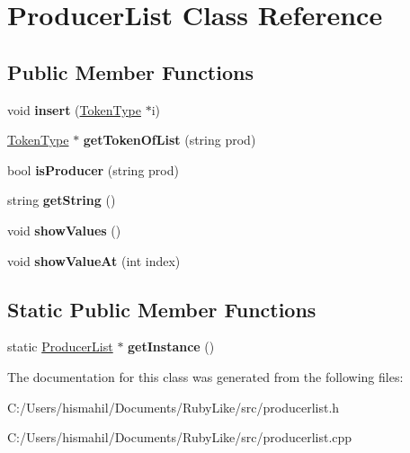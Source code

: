 \hypertarget{class_producer_list}{\section{Producer\-List Class Reference}
\label{class_producer_list}
}
\subsection*{Public Member Functions}
\begin{DoxyCompactItemize}
\item 
\hypertarget{class_producer_list_a3e17fb470a8d0079bcceb7c82e1ad45a}{void {\bfseries insert} (\hyperlink{class_token_type}{Token\-Type} $\ast$i)}\label{class_producer_list_a3e17fb470a8d0079bcceb7c82e1ad45a}

\item 
\hypertarget{class_producer_list_a0cb8b0344e7bd61da72b2e14f27ee12e}{\hyperlink{class_token_type}{Token\-Type} $\ast$ {\bfseries get\-Token\-Of\-List} (string prod)}\label{class_producer_list_a0cb8b0344e7bd61da72b2e14f27ee12e}

\item 
\hypertarget{class_producer_list_a6d34f625be27fbe3ba9851f9dd03e04b}{bool {\bfseries is\-Producer} (string prod)}\label{class_producer_list_a6d34f625be27fbe3ba9851f9dd03e04b}

\item 
\hypertarget{class_producer_list_a33ea5b4211d1709d8da4116a1630f8ab}{string {\bfseries get\-String} ()}\label{class_producer_list_a33ea5b4211d1709d8da4116a1630f8ab}

\item 
\hypertarget{class_producer_list_add7f3ea66a2ff4a8dc911b39a2212e98}{void {\bfseries show\-Values} ()}\label{class_producer_list_add7f3ea66a2ff4a8dc911b39a2212e98}

\item 
\hypertarget{class_producer_list_af3744891c313fc968e28108003e22bfa}{void {\bfseries show\-Value\-At} (int index)}\label{class_producer_list_af3744891c313fc968e28108003e22bfa}

\end{DoxyCompactItemize}
\subsection*{Static Public Member Functions}
\begin{DoxyCompactItemize}
\item 
\hypertarget{class_producer_list_aada51af5836a6086df9f86512c2e1963}{static \hyperlink{class_producer_list}{Producer\-List} $\ast$ {\bfseries get\-Instance} ()}\label{class_producer_list_aada51af5836a6086df9f86512c2e1963}

\end{DoxyCompactItemize}


The documentation for this class was generated from the following files\-:\begin{DoxyCompactItemize}
\item 
C\-:/\-Users/hismahil/\-Documents/\-Ruby\-Like/src/producerlist.\-h\item 
C\-:/\-Users/hismahil/\-Documents/\-Ruby\-Like/src/producerlist.\-cpp\end{DoxyCompactItemize}
